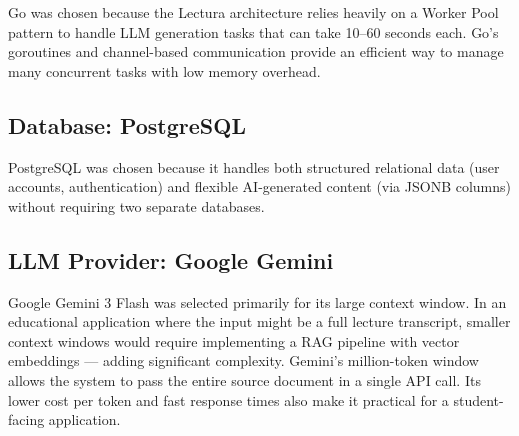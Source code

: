 Go was chosen because the Lectura architecture relies heavily on a Worker Pool pattern to handle LLM generation tasks that can take 10--60 seconds each. Go's goroutines and channel-based communication provide an efficient way to manage many concurrent tasks with low memory overhead.

\subsection{Database: PostgreSQL}
PostgreSQL was chosen because it handles both structured relational data (user accounts, authentication) and flexible AI-generated content (via JSONB columns) without requiring two separate databases.

\begin{table}[htbp]
\centering
{}
\vspace{6pt}
\caption{Database comparison based on schema flexibility and query performance.}
\label{tab:database_comparison}
\end{table}

\subsection{LLM Provider: Google Gemini}
Google Gemini 3 Flash was selected primarily for its large context window. In an educational application where the input might be a full lecture transcript, smaller context windows would require implementing a RAG pipeline with vector embeddings — adding significant complexity. Gemini's million-token window allows the system to pass the entire source document in a single API call. Its lower cost per token and fast response times also make it practical for a student-facing application.

